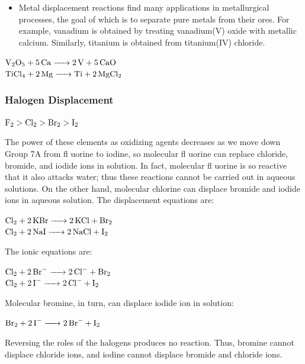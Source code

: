 \documentclass[a4paper,12pt,twocolumn]{article}
\begin{document}
\begin{itemize}
\item Metal displacement reactions find many applications in metallurgical processes,
the goal of which is to separate pure metals from their ores. For example, vanadium
is obtained by treating vanadium(V) oxide with metallic calcium.
Similarly, titanium is obtained from titanium(IV) chloride.
\end{itemize}
\begin{Box1}{}
$\ce{V2O5 + 5Ca -> 2V + 5CaO}$\\
$\ce{TiCl4 + 2Mg -> Ti + 2MgCl2}$
\end{Box1}
\subsubsection{Halogen Displacement}
\begin{Box1}{}
\begin{center}
$\ce{F2} > \ce{Cl2} > \ce{Br2} > \ce{I2}$
\end{center}
\end{Box1}
The power of these elements as oxidizing agents decreases as we move down Group
7A from fl uorine to iodine, so molecular fl uorine can replace chloride, bromide, and
iodide ions in solution. In fact, molecular fl uorine is so reactive that it also attacks
water; thus these reactions cannot be carried out in aqueous solutions. On the other
hand, molecular chlorine can displace bromide and iodide ions in aqueous solution.
The displacement equations are:
\begin{Box1}{}
$\ce{Cl2 + 2KBr -> 2KCl + Br2}$\\
$\ce{Cl2 + 2NaI -> 2NaCl + I2}$
\end{Box1}
The ionic equations are:
\begin{Box1}{}
$\ce{Cl2 + 2Br^{-} -> 2Cl^{-} + Br2}$\\
$\ce{Cl2 + 2I^{-} -> 2Cl^{-} + I2}$
\end{Box1}
Molecular bromine, in turn, can displace iodide ion in solution:
\begin{Box1}{}
$\ce{Br2 + 2I^{-} -> 2Br^{-} + I2}$
\end{Box1}
Reversing the roles of the halogens produces no reaction. Thus, bromine cannot displace
chloride ions, and iodine cannot displace bromide and chloride ions.
\end{document}
